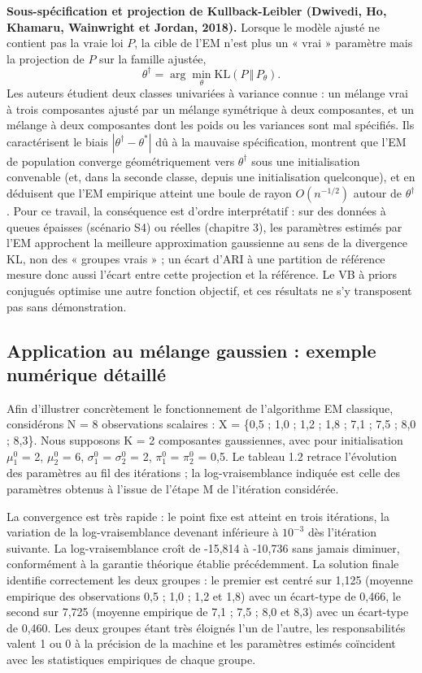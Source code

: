 \textbf{Sous-spécification et projection de Kullback-Leibler (Dwivedi, Ho, Khamaru, Wainwright et Jordan, 2018).} Lorsque le modèle ajusté ne contient pas la vraie loi $P$, la cible de l'EM n'est plus un « vrai » paramètre mais la projection de $P$ sur la famille ajustée,
\begin{equation*}
\theta^\dagger = \arg\min_{\theta} \mathrm{KL}(P \,\Vert\, P_\theta).
\end{equation*}
Les auteurs étudient deux classes univariées à variance connue : un mélange vrai à trois composantes ajusté par un mélange symétrique à deux composantes, et un mélange à deux composantes dont les poids ou les variances sont mal spécifiés. Ils caractérisent le biais $|\theta^\dagger - \theta^*|$ dû à la mauvaise spécification, montrent que l'EM de population converge géométriquement vers $\theta^\dagger$ sous une initialisation convenable (et, dans la seconde classe, depuis une initialisation quelconque), et en déduisent que l'EM empirique atteint une boule de rayon $O(n^{-1/2})$ autour de $\theta^\dagger$. Pour ce travail, la conséquence est d'ordre interprétatif : sur des données à queues épaisses (scénario S4) ou réelles (chapitre 3), les paramètres estimés par l'EM approchent la meilleure approximation gaussienne au sens de la divergence KL, non des « groupes vrais » ; un écart d'ARI à une partition de référence mesure donc aussi l'écart entre cette projection et la référence. Le VB à priors conjugués optimise une autre fonction objectif, et ces résultats ne s'y transposent pas sans démonstration.

\subsection{Application au mélange gaussien : exemple numérique détaillé}
Afin d'illustrer concrètement le fonctionnement de l'algorithme EM classique, considérons N = 8 observations scalaires : X = \{0,5 ; 1,0 ; 1,2 ; 1,8 ; 7,1 ; 7,5 ; 8,0 ; 8,3\}. Nous supposons K = 2 composantes gaussiennes, avec pour initialisation $\mu _{1}^{0}$ = 2, $\mu _{2}^{0}$ = 6, $\sigma _{1}^{0}$ = $\sigma _{2}^{0}$ = 2, $\pi _{1}^{0}$ = $\pi _{2}^{0}$ = 0,5. Le tableau 1.2 retrace l'évolution des paramètres au fil des itérations ; la log-vraisemblance indiquée est celle des paramètres obtenus à l'issue de l'étape M de l'itération considérée.

La convergence est très rapide : le point fixe est atteint en trois itérations, la variation de la log-vraisemblance devenant inférieure à $10^{-3}$ dès l'itération suivante. La log-vraisemblance croît de -15,814 à -10,736 sans jamais diminuer, conformément à la garantie théorique établie précédemment. La solution finale identifie correctement les deux groupes : le premier est centré sur 1,125 (moyenne empirique des observations 0,5 ; 1,0 ; 1,2 et 1,8) avec un écart-type de 0,466, le second sur 7,725 (moyenne empirique de 7,1 ; 7,5 ; 8,0 et 8,3) avec un écart-type de 0,460. Les deux groupes étant très éloignés l'un de l'autre, les responsabilités valent 1 ou 0 à la précision de la machine et les paramètres estimés coïncident avec les statistiques empiriques de chaque groupe.

